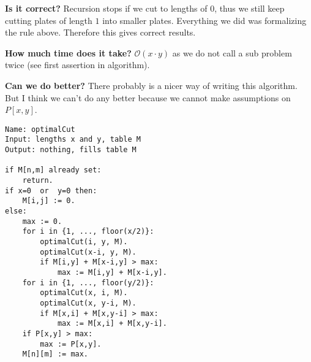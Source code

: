 \documentclass[12pt]{article}
\begin{document}
 \vspace{.5cm}
 \textbf{Is it correct?} Recursion stops if we cut to lengths of $0$, thus we still keep cutting plates of length $1$ into smaller plates. Everything we did was formalizing the rule above. Therefore this gives correct results.
 
 \textbf{How much time does it take?} $\mathcal{O}(x\cdot y)$ as we do not call a sub problem twice (see first assertion in algorithm).

 \textbf{Can we do better?} There probably is a nicer way of writing this algorithm. But I think we can't do any better because we cannot make assumptions on $P[x,y]$.

\begin{lstlisting}[caption={Cutting marble recursively},label={algo:4}]
Name: optimalCut
Input: lengths x and y, table M
Output: nothing, fills table M

if M[n,m] already set:
    return.
if x=0  or  y=0 then:
    M[i,j] := 0.
else:
    max := 0.
    for i in {1, ..., floor(x/2)}:
        optimalCut(i, y, M).
        optimalCut(x-i, y, M).
        if M[i,y] + M[x-i,y] > max:
            max := M[i,y] + M[x-i,y].
    for i in {1, ..., floor(y/2)}:
        optimalCut(x, i, M).
        optimalCut(x, y-i, M).
        if M[x,i] + M[x,y-i] > max:
            max := M[x,i] + M[x,y-i].
    if P[x,y] > max:
        max := P[x,y].
    M[n][m] := max.
\end{lstlisting}
 
\end{document}
